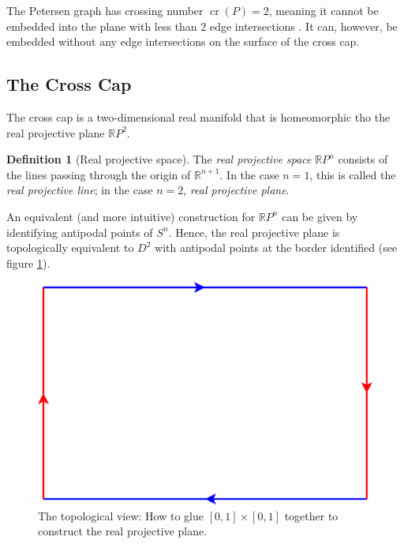 \documentclass[12pt,            %
               a4paper,         %
               oneside,         %
               DIV12,           %
               fleqn,           %
               halfparskip,     %
               nochapterprefix, %
               bibtotocnumbered,%
              ]{scrartcl} %
\theoremstyle{definition}
\newtheorem{definition}{Definition}
\begin{document}
The Petersen graph has crossing number $\operatorname{cr}(P) = 2$,
meaning it cannot be embedded into the plane with less than 2 edge
intersections \cite[p.~2]{crossingnr}. It can, however, be embedded
without any edge intersections on the surface of the cross cap.

\subsection{The Cross Cap}

\begin{minipage}{0.55\textwidth}
  The cross cap is a two-dimensional real manifold that is homeomorphic
  tho the real projective plane $\mathbb{R}P^2$.

  \begin{definition}[Real projective space]
    The \emph{real projective space} $\mathbb{R}P^n$ consists of the lines
    passing through the origin of $\mathbb{R}^{n+1}$. In the case $n=1$,
    this is called the \emph{real projective line}; in the case $n=2$,
    \emph{real projective plane}.
  \end{definition}

  An equivalent (and more intuitive) construction for $\mathbb{R}P^n$
  can be given by identifying antipodal points of $S^n$. Hence, the real
  projective plane is topologically equivalent to $D^2$ with antipodal
  points at the border identified (see figure \ref{fig:rp2}).
\end{minipage}%
\hfill%
\begin{minipage}{0.35\textwidth}
  \begin{figure}[H]
    \centering
    \includegraphics[keepaspectratio=true,width=\textwidth]{../planar-graphs/crosscap-construction.pdf}
    \caption{The topological view: How to glue $[0,1]\times[0,1]$
      together to construct the real projective plane.}
    \label{fig:rp2}
  \end{figure}
\end{minipage}%
\end{document}
